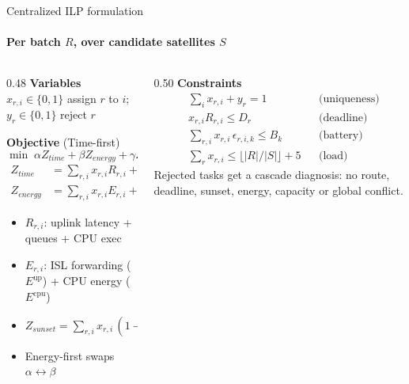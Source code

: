 \documentclass{beamer}
\begin{document}
\begin{frame}{Centralized ILP formulation}
\framesubtitle{Per batch $R$, over candidate satellites $S$}
\footnotesize
\begin{columns}[T]
\begin{column}{0.48\textwidth}
\textbf{Variables}\\
$x_{r,i}\in\{0,1\}$ assign $r$ to $i$; $y_r\in\{0,1\}$ reject $r$

\vspace{3pt}
\textbf{Objective} (Time-first)
\[
\min\; \alpha Z_{time}+\beta Z_{energy}+\gamma Z_{sunset}
\]
\vspace{-8pt}
\begin{align*}
Z_{time}   &= \sum_{r,i} x_{r,i}R_{r,i} + P_{drop}\sum_r y_r\\[2pt]
Z_{energy} &= \sum_{r,i} x_{r,i}E_{r,i} + P_{drop}\sum_r y_r
\end{align*}
\vspace{-6pt}
\begin{itemize}\setlength\itemsep{1.5pt}
  \item $R_{r,i}$: uplink latency + queues + CPU exec
  \item $E_{r,i}$: ISL forwarding ($E^{\text{up}}$) + CPU energy ($E^{\text{cpu}}$)
  \item $Z_{sunset} = \sum_{r,i} x_{r,i}\,(1 - \frac{t_{sunset,i}}{t_{max}})$
  \item Energy-first swaps $\alpha\leftrightarrow\beta$
\end{itemize}
\end{column}
\begin{column}{0.50\textwidth}
\textbf{Constraints}
\begin{align*}
&\textstyle\sum_{i} x_{r,i}+y_r=1 && \text{(uniqueness)}\\
&x_{r,i}R_{r,i}\le D_r && \text{(deadline)}\\
&\textstyle\sum_{r,i} x_{r,i}\,\epsilon_{r,i,k}\le B_k && \text{(battery)}\\
&\textstyle\sum_{r} x_{r,i}\le\lfloor |R|/|S|\rfloor+5 && \text{(load)}
\end{align*}
\vspace{2pt}
Rejected tasks get a \alert{cascade diagnosis}: no route, deadline, sunset, energy, capacity or global conflict.
\end{column}
\end{columns}
\end{frame}
\end{document}
